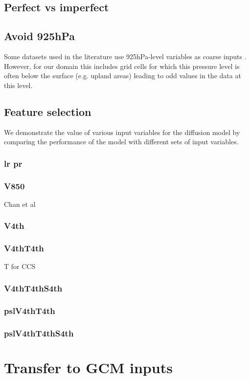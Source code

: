 \subsection{Perfect vs imperfect}

\subsection{Avoid 925hPa}

Some datasets used in the literature use 925hPa-level variables as coarse inputs \parencite[e.g.][]{}.
However, for our domain this includes grid cells for which this pressure level is often below the surface (e.g. upland areas) leading to odd values in the data at this level.

\subsection{Feature selection}

We demonstrate the value of various input variables for the diffusion model by comparing the performance of the model with different sets of input variables.

\subsubsection{lr pr}

\subsubsection{V850}

Chan et al

\subsubsection{V4th}

\subsubsection{V4thT4th}

T for CCS

\subsubsection{V4thT4thS4th}

\subsubsection{pslV4thT4th}

\subsubsection{pslV4thT4thS4th}

\section{Transfer to GCM inputs}
